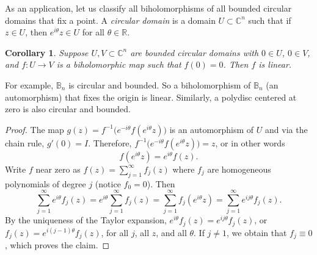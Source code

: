 \documentclass[12pt,openany]{book}
\newcommand{\C}{{\mathbb{C}}}
\newcommand{\R}{{\mathbb{R}}}
\newcommand{\bB}{{\mathbb{B}}}
\newcommand{\myindex}[1]{#1\index{#1}}
\theoremstyle{plain}
\newtheorem{cor}[thm]{Corollary}
\theoremstyle{remark}
\theoremstyle{definition}
\theoremstyle{exercise}
\theoremstyle{example}
\begin{document}
As an application, let us classify all biholomorphisms of all bounded
circular domains that fix a point.
A \emph{\myindex{circular domain}} is a domain
$U \subset \C^n$ such that if $z \in U$, then $e^{i\theta} z \in U$ for
all $\theta \in \R$.

\begin{cor}
Suppose $U, V \subset \C^n$ are bounded circular domains with $0 \in U$, $0 \in
V$, and $f \colon U \to V$ is
a biholomorphic map such that $f(0) = 0$.  Then $f$ is linear.
\end{cor}

For example, $\bB_n$ is circular and bounded.  So a biholomorphism of $\bB_n$
(an automorphism)
that fixes the origin is linear.  Similarly, a polydisc centered at zero is
also circular and bounded.

\begin{proof}
The map $g(z) = f^{-1}\bigl(e^{-i\theta}f(e^{i\theta} z)\bigr)$ is an
automorphism of $U$ and via the
chain rule, $g'(0) = I$.  Therefore,
$f^{-1}\bigl(e^{-i\theta}f(e^{i\theta} z)\bigr) = z$, or in other words
\begin{equation*}
f(e^{i\theta} z) = e^{i\theta}f(z) .
\end{equation*}
Write $f$ near zero as $f(z) = \sum_{j=1}^\infty f_j(z)$ where $f_j$ are
homogeneous polynomials of degree $j$ (notice $f_0 = 0$).  Then
\begin{equation*}
\sum_{j=1}^\infty e^{i\theta} f_j(z) 
=
e^{i\theta} \sum_{j=1}^\infty f_j(z) 
=
\sum_{j=1}^\infty f_j(e^{i\theta} z)
=
\sum_{j=1}^\infty e^{ij\theta}f_j(z) .
\end{equation*}
By the uniqueness of the Taylor expansion, 
$e^{i\theta} f_j(z)  = e^{ij\theta} f_j(z)$, or
$f_j(z)  = e^{i(j-1)\theta} f_j(z)$,
for all $j$, all $z$, and all $\theta$.
If $j\not=1$, we obtain that $f_j \equiv
0$, which proves the claim.
\end{proof}
\end{document}
